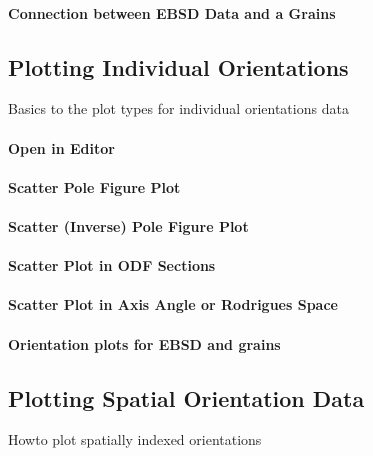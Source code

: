 \documentclass{article}
\begin{document}
			\paragraph{Connection between EBSD Data and a Grains}
		
		\subsection{Plotting Individual Orientations}

		
                     \begin{par}
Basics to the plot types for individual orientations data
\end{par} \vspace{1em}

                  
			\paragraph{Open in Editor}
		
			\paragraph{Scatter Pole Figure Plot}
		
			\paragraph{Scatter (Inverse) Pole Figure Plot}
		
			\paragraph{Scatter Plot in ODF Sections}
		
			\paragraph{Scatter Plot in Axis Angle or Rodrigues Space}
		
			\paragraph{Orientation plots for EBSD and grains}
		
		\subsection{Plotting Spatial Orientation Data}

		
                     \begin{par}
Howto plot spatially indexed orientations
\end{par} \vspace{1em}
\end{document}
